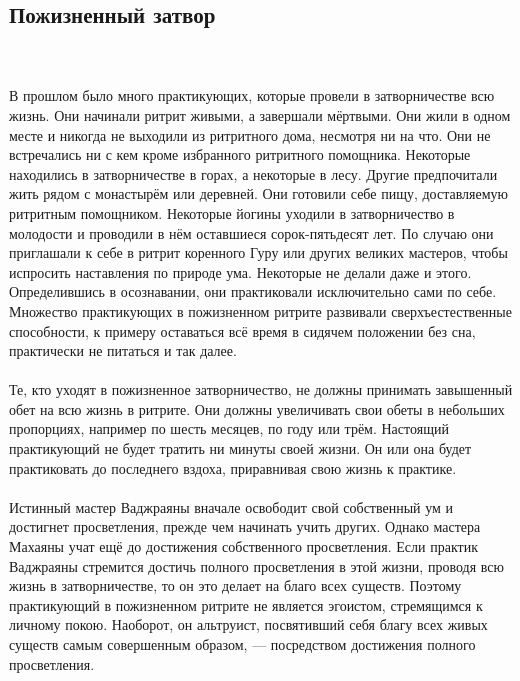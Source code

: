 \subsection{Пожизненный затвор}
\\ \\ В прошлом было много практикующих, которые провели в затворничестве всю жизнь. Они начинали ритрит живыми, а завершали мёртвыми. Они жили в одном месте и никогда не выходили из ритритного дома, несмотря ни на что. Они не встречались ни с кем кроме избранного ритритного помощника. Некоторые находились в затворничестве в горах, а некоторые в лесу. Другие предпочитали жить рядом с монастырём или деревней. Они готовили себе пищу, доставляемую ритритным помощником. Некоторые йогины уходили в затворничество в молодости и проводили в нём оставшиеся сорок-пятьдесят лет. По случаю они приглашали к себе в ритрит коренного Гуру или других великих мастеров, чтобы испросить наставления по природе ума. Некоторые не делали даже и этого. Определившись в осознавании, они практиковали исключительно сами по себе. Множество практикующих в пожизненном ритрите развивали сверхъестественные способности, к примеру оставаться всё время в сидячем положении без сна, практически не питаться и так далее.
\\ \\ Те, кто уходят в пожизненное затворничество, не должны принимать завышенный обет на всю жизнь в ритрите. Они должны увеличивать свои обеты в небольших пропорциях, например по шесть месяцев, по году или трём. Настоящий практикующий не будет тратить ни минуты своей жизни. Он или она будет практиковать до последнего вздоха, приравнивая свою жизнь к практике.
\\ \\ Истинный мастер Ваджраяны вначале освободит свой собственный ум и достигнет просветления, прежде чем начинать учить других. Однако мастера Махаяны учат ещё до достижения собственного просветления. Если практик Ваджраяны стремит\-ся достичь полного просветления в этой жизни, проводя всю жизнь в затворничестве, то он это делает на благо всех существ. Поэтому практикующий в пожизненном ритрите не является эгоистом, стремящимся к личному покою. Наоборот, он альтруист, посвятивший себя благу всех живых существ самым совершенным образом, — посредством достижения полного просветления.
